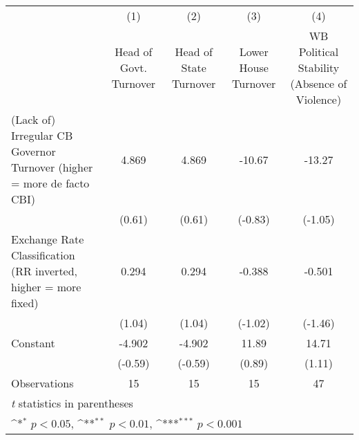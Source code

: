 {
\def\sym#1{\ifmmode^{#1}\else\(^{#1}\)\fi}
\begin{tabular}{l*{4}{c}}
\hline\hline
                &\multicolumn{1}{c}{(1)}&\multicolumn{1}{c}{(2)}&\multicolumn{1}{c}{(3)}&\multicolumn{1}{c}{(4)}\\
                &\multicolumn{1}{c}{Head of Govt. Turnover}&\multicolumn{1}{c}{Head of State Turnover}&\multicolumn{1}{c}{Lower House Turnover}&\multicolumn{1}{c}{WB Political Stability (Absence of Violence)}\\
\hline
(Lack of) Irregular CB Governor Turnover (higher = more de facto CBI)&    4.869         &    4.869         &   -10.67         &   -13.27         \\
                &   (0.61)         &   (0.61)         &  (-0.83)         &  (-1.05)         \\
[1em]
Exchange Rate Classification (RR inverted, higher = more fixed)&    0.294         &    0.294         &   -0.388         &   -0.501         \\
                &   (1.04)         &   (1.04)         &  (-1.02)         &  (-1.46)         \\
[1em]
Constant        &   -4.902         &   -4.902         &    11.89         &    14.71         \\
                &  (-0.59)         &  (-0.59)         &   (0.89)         &   (1.11)         \\
\hline
Observations    &       15         &       15         &       15         &       47         \\
\hline\hline
\multicolumn{5}{l}{\footnotesize \textit{t} statistics in parentheses}\\
\multicolumn{5}{l}{\footnotesize \sym{*} \(p<0.05\), \sym{**} \(p<0.01\), \sym{***} \(p<0.001\)}\\
\end{tabular}
}
